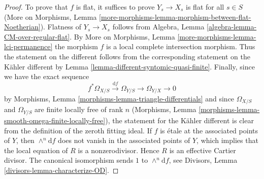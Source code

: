 \documentclass[10pt,a4paper]{amsart}
\theoremstyle{plain}
\theoremstyle{definition}
\theoremstyle{remark}
\numberwithin{equation}{subsection}
\begin{document}
\begin{proof}
To prove that $f$ is flat, it suffices to prove $Y_s \to X_s$
is flat for all $s \in S$ (More on Morphisms, Lemma
\ref{more-morphisms-lemma-morphism-between-flat-Noetherian}).
Flatness of $Y_s \to X_s$ follows from
Algebra, Lemma \ref{algebra-lemma-CM-over-regular-flat}.
By More on Morphisms, Lemma
\ref{more-morphisms-lemma-lci-permanence}
the morphism $f$ is a local complete intersection morphism.
Thus the statement on the different follows from the
corresponding statement on the K\"ahler different by
Lemma \ref{lemma-different-syntomic-quasi-finite}.
Finally, since we have the exact sequence
$$
f^*\Omega_{X/S} \xrightarrow{\text{d}f} \Omega_{Y/S} \to \Omega_{Y/X} \to 0
$$
by Morphisms, Lemma \ref{morphisms-lemma-triangle-differentials}
and since $\Omega_{X/S}$ and $\Omega_{Y/S}$ are finite locally free
of rank $n$ (Morphisms, Lemma
\ref{morphisms-lemma-smooth-omega-finite-locally-free}),
the statement for the K\"ahler different is clear from the definition
of the zeroth fitting ideal. If $f$ is \'etale at the associated
points of $Y$, then $\wedge^n\text{d}f$ does not vanish in
the associated points of $Y$, which implies that the local equation
of $R$ is a nonzerodivisor. Hence $R$ is an effective Cartier divisor.
The canonical isomorphism sends $1$ to $\wedge^n\text{d}f$, see
Divisors, Lemma \ref{divisors-lemma-characterize-OD}.
\end{proof}
\end{document}

